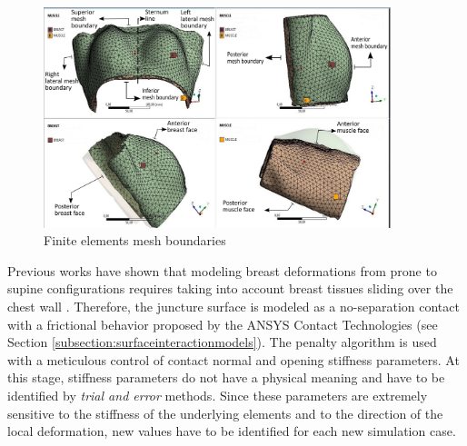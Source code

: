 \begin{figure}[!h]
\centering
\includegraphics[width=0.9\textwidth,keepaspectratio]{figures/mesh_parts_2.png} 
\caption{Finite elements mesh boundaries}\label{fig:meshboundaries}
\end{figure}

Previous works have shown that modeling breast deformations from prone to supine configurations requires taking into account breast tissues sliding over the chest wall \citep{carter_application_2012,han_nonlinear_2014}.  Therefore, the juncture surface is modeled as a no-separation contact with a frictional behavior proposed by the ANSYS Contact Technologies (see Section \ref{subsection:surfaceinteractionmodels}). The penalty algorithm is used with a meticulous control of contact normal and opening stiffness parameters. At this stage, stiffness parameters do not have a physical meaning and have to be identified by \textit{trial and error} methods. Since these parameters are extremely sensitive to the stiffness of the underlying elements and to the direction of the local deformation, new values have to be identified for each new simulation case.    


